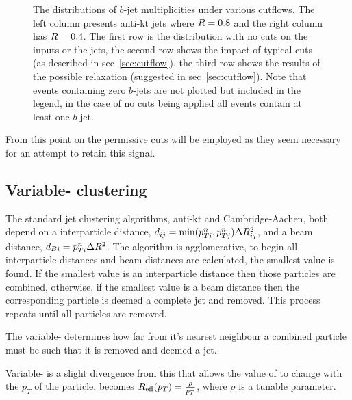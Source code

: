 \begin{figure}[t!]
	\caption{The distributions of $b$-jet multiplicities under various cutflows.
        The left column presents anti-kt jets where \(R{}=0.8\) and the right column has \(R{}=0.4\).
        The first row is the distribution with no cuts on the inputs or the jets,
        the second row shows the impact of typical cuts (as described in sec~\ref{sec:cutflow}),
        the third row shows the results of the possible relaxation (suggested in sec~\ref{sec:cutflow}).
        Note that events containing zero $b$-jets are not plotted but included in the legend, in the case of no cuts being applied all events contain at least one $b$-jet.}
\label{fig:nbjets}
\end{figure}

From this point on the permissive cuts will be employed as they seem necessary
for an attempt to retain this signal.

\subsection{Variable-\stoppingdeltar{} clustering}
The standard jet clustering algorithms, anti-kt and Cambridge-Aachen,
both depend on a interparticle distance,
\( d_{ij} = \text{min}(p^n_{Ti}, p^n_{Tj})\Delta R{}^2_{ij}\), 
and a beam distance,
\( d_{Bi} = p^n_{Ti}\Delta R{}^2\).
The algorithm is agglomerative, to begin 
all interparticle distances and beam distances are calculated,
the smallest value is found.
If the smallest value is an interparticle distance 
then those particles are combined,
otherwise, if the smallest value is a beam distance
then the corresponding particle is deemed a complete jet and removed.
This process repeats until all particles are removed.

The variable-\stoppingdeltar{} determines how far from it's nearest neighbour
a combined particle must be such that it is removed and deemed a jet.

Variable-\stoppingdeltar{} is a slight divergence from this that allows the
value of \stoppingdeltar{} to change with the \(p_T\) of the particle.
\stoppingdeltar{} becomes \(R{}_\text{eff}(p_T) = \frac{\rho}{p_T}\), where \(\rho\)
is a tunable parameter.

